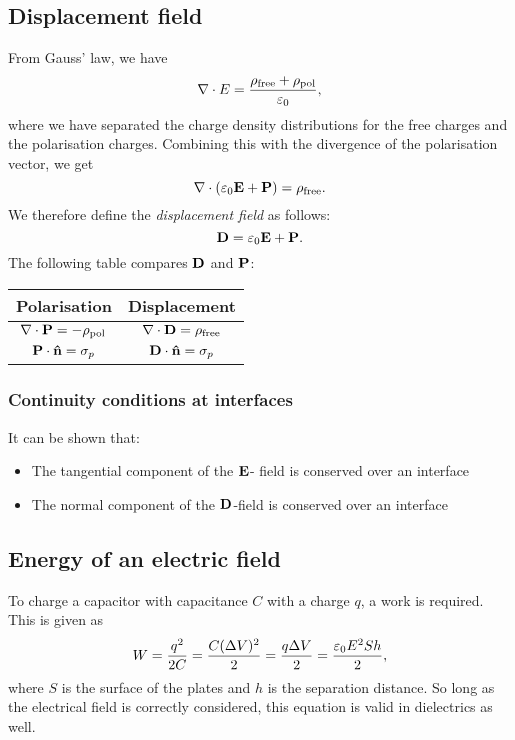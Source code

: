 \subsection{Displacement field}
    From Gauss' law, we have 
    \begin{equation*}
        \nabla \cdot E = \frac{\rho_{\text{free}} + \rho_{\text{pol}}}{\varepsilon_0},
    \end{equation*}
    where we have separated the charge density distributions for the free charges and the polarisation charges. 
    Combining this with the divergence of the polarisation vector, we get 
    \begin{equation*}
        \nabla \cdot \left(\varepsilon_0\mathbf{E} + \mathbf{P}\right) = \rho_{\text{free}}.
    \end{equation*}
    We therefore define the \textit{displacement field} as follows:
    \begin{equation}
        \mathbf{D} = \varepsilon_0\mathbf{E} + \mathbf{P}.
    \end{equation}
    The following table compares $\mathbf{D}$ and $\mathbf{P}$:
    \begin{center}
        \begin{tabular}{ c|c } 
        Polarisation & Displacement \\
        \hline
         $\nabla \cdot \mathbf{P} = -\rho_{\text{pol}}$ & $\nabla \cdot \mathbf{D} = \rho_{\text{free}}$ \\
         $\p \cdot \hat{n} = \sigma_p$ & $\D \cdot \hat{n} = \sigma_p$
        \end{tabular}
    \end{center}

    \subsubsection{Continuity conditions at interfaces}
        It can be shown that:
        \begin{itemize}
            \item The tangential component of the $\mathbf{E}$- field is conserved over an interface
            \item The normal component of the $\mathbf{D}$-field is conserved over an interface
        \end{itemize}

\subsection{Energy of an electric field}
    To charge a capacitor with capacitance $C$ with a charge $q$, a work is required. This is given as 
    \begin{equation}
        W = \frac{q^2}{2C} = \frac{C(\Delta V)^2}{2} = \frac{q\Delta V}{2} = \frac{\varepsilon_0 E^2S h}{2},
    \end{equation}
    where $S$ is the surface of the plates and $h$ is the separation distance. 
    So long as the electrical field is correctly considered, this equation is valid in dielectrics as well.
    
